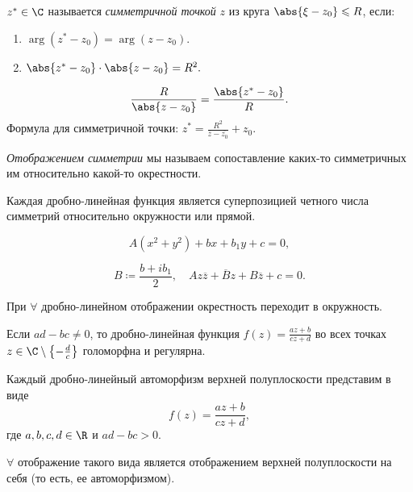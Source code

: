 \begin{definition}
	$z^* \in \C$ называется \emph{симметричной точкой} $z$ из круга $\abs{\xi - z_0} \leqslant R$, если:
	\begin{enumerate}
		\item $\arg(z^* - z_0) = \arg(z-z_0)$.
		\item $\abs{z^* - z_0} \cdot \abs{z - z_0}  = R^2.$
	\end{enumerate}
	\begin{figure}[H]
		\centering
		\label{fig:fig-13}
	\end{figure}
	\[
		\frac{R}{\abs{z-z_0} } = \frac{\abs{z^* - z_0} }{R} .
	\]
	Формула для симметричной точки: $z^* = \frac{R^2}{\overline{z} -\overline{z_0} } + z_0$.
\end{definition}

\begin{definition}
	\emph{Отображением симметрии} мы называем сопоставление каких-то симметричных им относительно какой-то окрестности.
\end{definition}

\begin{theorem}
	Каждая дробно-линейная функция является суперпозицией четного числа симметрий относительно окружности или прямой.
\end{theorem}

\begin{definition}
	\[
		A(x^2 + y^2) + bx + b_1 y + c = 0,
	\]

	\[
		B \coloneq \frac{b + ib_1}{2} , \quad Az \overline{z}  + \overline{B} z + B \overline{z} + c = 0.
	\]
\end{definition}

\begin{theorem}
	При $\forall $ дробно-линейном отображении окрестность переходит в окружность.
\end{theorem}

\begin{theorem}
	Если $ad - bc \ne 0$, то дробно-линейная функция $f(z) = \frac{az + b}{cz + d} $ во всех точках $z \in \C \setminus \left\{-\frac{d}{c} \right\}$ голоморфна и регулярна.
\end{theorem}

\begin{theorem}
	Каждый дробно-линейный автоморфизм верхней полуплоскости представим в виде
	\[
		f(z) = \frac{az + b}{cz + d} ,
	\]
	где $a,b,c,d \in \R$ и $ad - bc > 0$.

	$\forall $ отображение такого вида является отображением верхней полуплоскости на себя (то есть, ее автоморфизмом).
\end{theorem}

